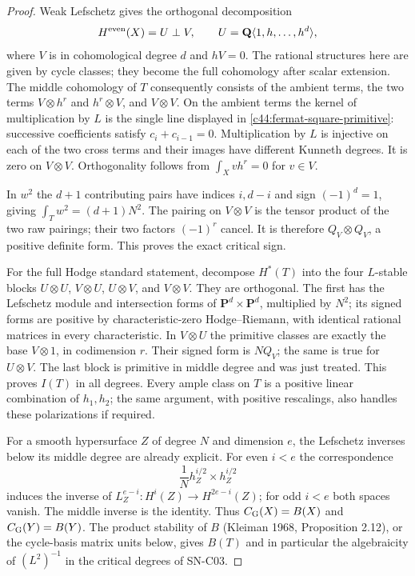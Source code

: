 \begin{proof}
Weak Lefschetz gives the orthogonal decomposition
\[
 H^{\rm even}(X)=U\perp V,\qquad
 U=\mathbf Q\langle1,h,\ldots,h^d\rangle,
\]
where $V$ is in cohomological degree $d$ and $hV=0$.
The rational structures here are given by cycle classes;
they become the full cohomology after scalar extension.
The middle cohomology of $T$ consequently consists of the
ambient terms, the two terms $V\otimes h^r$ and
$h^r\otimes V$, and $V\otimes V$.  On the ambient
terms the kernel of multiplication by $L$ is the single
line displayed in \eqref{c44:fermat-square-primitive}:
successive coefficients satisfy $c_i+c_{i-1}=0$.
Multiplication by $L$ is injective on each of the two
cross terms and their images have different Kunneth
degrees.  It is zero on $V\otimes V$.  Orthogonality
follows from $\int_Xvh^r=0$ for $v\in V$.

In $w^2$ the $d+1$ contributing pairs have indices
$i,d-i$ and sign $(-1)^d=1$, giving
$\int_Tw^2=(d+1)N^2$.  The pairing on $V\otimes V$
is the tensor product of the two raw pairings; their
two factors $(-1)^r$ cancel.  It is therefore
$Q_V\otimes Q_V$, a positive definite form.  This proves
the exact critical sign.

For the full Hodge standard statement, decompose
$H^*(T)$ into the four $L$-stable blocks
$U\otimes U$, $V\otimes U$, $U\otimes V$, and
$V\otimes V$.  They are orthogonal.  The first has
the Lefschetz module and intersection forms of
$\mathbf P^d\times\mathbf P^d$, multiplied by $N^2$;
its signed forms are positive by characteristic-zero
Hodge--Riemann, with identical rational matrices in
every characteristic.  In $V\otimes U$ the primitive
classes are exactly the base $V\otimes1$, in
codimension $r$.  Their signed form is $NQ_V$;
the same is true for $U\otimes V$.  The last block
is primitive in middle degree and was just treated.
This proves $I(T)$ in all degrees.  Every ample
class on $T$ is a positive linear combination of
$h_1,h_2$; the same argument, with positive rescalings,
also handles these polarizations if required.

For a smooth hypersurface $Z$ of degree $N$ and
dimension $e$, the Lefschetz inverses below its middle
degree are already explicit.  For even $i<e$ the
correspondence
\[
 \frac1N h_Z^{i/2}\times h_Z^{i/2}
\]
induces the inverse of
$L_Z^{e-i}:H^i(Z)\longrightarrow H^{2e-i}(Z)$;
for odd $i<e$ both spaces vanish.  The middle inverse
is the identity.  Thus $C_{\rm G}(X)=B(X)$ and
$C_{\rm G}(Y)=B(Y)$.  The product stability of $B$
(Kleiman 1968, Proposition 2.12), or the cycle-basis
matrix units below, gives $B(T)$ and in particular
the algebraicity of $(L^2)^{-1}$ in the critical
degrees of SN-C03.


\end{proof}

